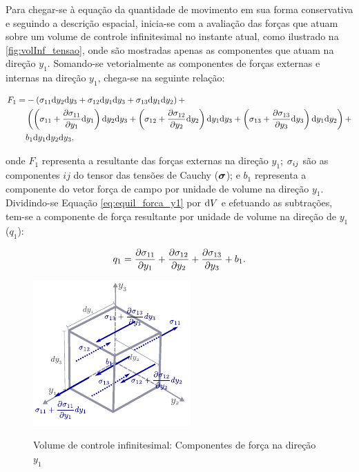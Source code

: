 Para chegar-se à equação da quantidade de movimento em sua forma conservativa e seguindo a descrição espacial, inicia-se com a avaliação das forças que atuam sobre um volume de controle infinitesimal no instante atual, como ilustrado na \autoref{fig:volInf_tensao}, onde são mostradas apenas as componentes que atuam na direção $y_1$. Somando-se vetorialmente as componentes de forças externas e internas na direção $y_1$, chega-se na seguinte relação:

\begin{align}
	\begin{split}
	F_1 =& -\left(\sigma_{11}\mathrm{d} y_2 \mathrm{d} y_3 + \sigma_{12}\mathrm{d} y_1 \mathrm{d} y_3 + \sigma_{13}\mathrm{d} y_1 \mathrm{d} y_2\right) + \\ & \left(\left(\sigma_{11} + \frac{\partial \sigma_{11}}{\partial y_1}\mathrm{d} y_1 \right)\mathrm{d} y_2 \mathrm{d} y_3 + \left(\sigma_{12}+ \frac{\partial \sigma_{12}}{\partial y_2}\mathrm{d} y_2\right)\mathrm{d} y_1 \mathrm{d} y_3 + \left(\sigma_{13}+ \frac{\partial \sigma_{13}}{\partial y_3}\mathrm{d} y_3\right)\mathrm{d} y_1 \mathrm{d} y_2\right) + \\& b_{1}\mathrm{d} y_1 \mathrm{d} y_2 \mathrm{d} y_3, \label{eq:equil_forca_y1} 
	\end{split}
\end{align}	

\noindent onde $F_1$ representa a resultante das forças externas na direção $y_1$; $\sigma_{ij}$ são as componentes $ij$ do tensor das tensões de Cauchy ($\boldsymbol{\sigma}$); e $b_1$ representa a componente do vetor força de campo por unidade de volume na direção $y_1$. Dividindo-se Equação \eqref{eq:equil_forca_y1} por $\mathrm{d} V$ e efetuando as subtrações, tem-se a componente de força resultante por unidade de volume na direção de $y_1$ ($q_1$):

\begin{align}
		q_1 =\frac{\partial \sigma_{11}}{\partial y_1} + \frac{\partial \sigma_{12}}{\partial y_2} + \frac{\partial \sigma_{13}}{\partial y_3} + b_{1}.
\end{align}	

\begin{figure}[!htbp]
	\caption{Volume de controle infinitesimal: Componentes de força na direção $y_1$}
	\begin{center} 
	\includegraphics[scale=1.5,trim=0cm 0.0cm 0cm 0.0cm, clip=true]{Imagens/Cap2/volInf_tensao.pdf}	
	\label{fig:volInf_tensao}
	\end{center}
\end{figure}

